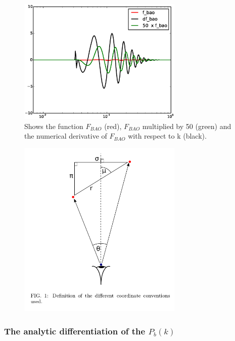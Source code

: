 \documentclass[10pt,a4paper]{article}
\begin{document}
\begin{figure}
\includegraphics[width=0.7\textwidth]{derivative_of_fbao.eps}
\caption{Shows the function $F_{BAO}$ (red), $F_{BAO}$ multiplied by 50 (green) and the numerical derivative of $F_{BAO}$ with respect to k (black). }
\label{fig:diff_FBAO}
\end{figure}
\begin{figure}
\includegraphics[width=0.7\textwidth]{mu_angle.png}
\caption{}
\label{fig:mu}
\end{figure}
\subsubsection{The analytic  differentiation of the $P_b(k)$ }
\end{document}
